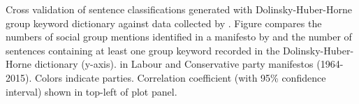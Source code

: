 Cross validation of sentence classifications generated with Dolinsky-Huber-Horne group keyword dictionary against data collected by \citet{thau_how_2019}. Figure compares the numbers of social group mentions identified in a manifesto by \citet[see x-axis]{thau_how_2019} and the number of sentences containing at least one group keyword recorded in the Dolinsky-Huber-Horne dictionary (y-axis). in Labour and Conservative party manifestos (1964-2015). Colors indicate parties. Correlation coefficient (with 95\% confidence interval) shown in top-left of plot panel. \label{fig:uk_manifestos_dhh_sg_sentence_counts_cross_validation}

